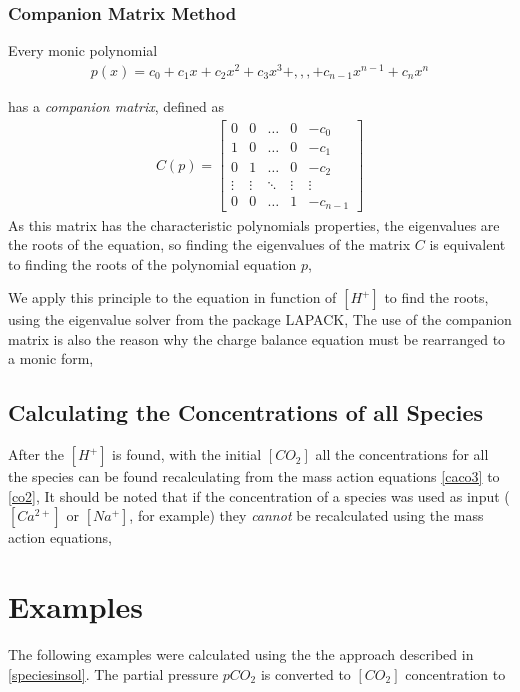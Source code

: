 \documentclass[11pt,a4paper,twoside]{report}
\begin{document}
\subsection{Companion Matrix Method}\label{companion}
Every monic polynomial
\begin{align}
p(x) = c_{0} + c_{1}x + c_{2}x^{2} + c_{3}x^{3} + ,,, + c_{n-1}x^{n-1} + c_{n}x^{n}
\end{align}

 has a \textit{companion matrix}, defined as
\begin{align}
  C(p)=
  \begin{bmatrix}
  0 & 0 & \dots & 0 & -c_0 \\
  1 & 0 & \dots & 0 & -c_1 \\
  0 & 1 & \dots & 0 & -c_2 \\
   \vdots & \vdots & \ddots & \vdots & \vdots \\
   0 & 0 & \dots & 1 & -c_{n-1}
  \end{bmatrix}
\end{align}
As this matrix has the characteristic polynomials properties, the eigenvalues are the roots of the equation, so finding the eigenvalues of the matrix $C$ is equivalent to finding the roots of the polynomial equation $p$, 

We apply this principle to the equation in function of $[H^{+}]$ to find the roots, using the eigenvalue solver from the package LAPACK, The use of the companion matrix is also the reason why the charge balance equation must be rearranged to a monic form,

\section{Calculating the Concentrations of all Species}
After the $[H^{+}]$ is found, with the initial $[CO_{2}]$ all the concentrations for all the species can be found recalculating from the mass action equations \eqref{caco3} to \eqref{co2}, It should be noted that if the concentration of a species was used as input ($[Ca^{2+}]$ or $[Na^{+}]$, for example) they \textit{cannot} be recalculated using the mass action equations,









\chapter{Examples}
The following examples were calculated using the the approach described in \eqref{speciesinsol}. The partial pressure $pCO_{2}$ is converted to $[CO_{2}]$ concentration to 
\end{document}
